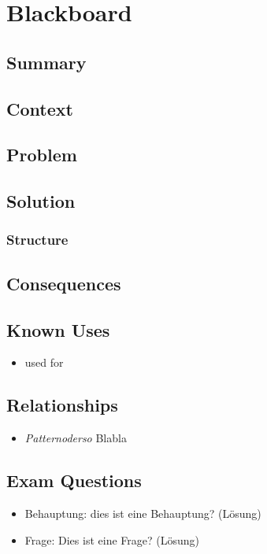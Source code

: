 \chapter{Blackboard}

\section{Summary}
  
\section{Context}



\section{Problem}

\section{Solution}


\subsection{Structure}

\section{Consequences}
\begin{itemize}
    
\end{itemize}

\section{Known Uses}
\begin{itemize}
	\item used for
\end{itemize}

\section{Relationships}
\begin{itemize}
	\item \textit{Patternoderso} Blabla
\end{itemize}

\section{Exam Questions}
\begin{itemize}
  \item Behauptung: dies ist eine Behauptung? (Lösung)
    \item Frage: Dies ist eine Frage? (Lösung)
\end{itemize}

